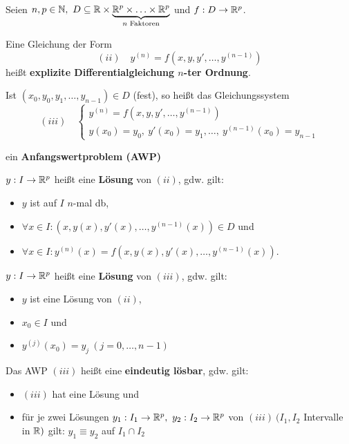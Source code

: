 \documentclass[a4paper,twoside,DIV15,BCOR12mm]{scrbook}
\begin{document}
\begin{definition}
Seien $n,p \in\MdN,\ D\subseteq\MdR\times\underbrace{\MdR^p\times\ldots\times\MdR^p}_{n\text{ Faktoren}}$ und $f:D\to\mathbb{R}^p$.

Eine Gleichung der Form $$(ii)\quad y^{(n)} = f(x,y,y',\ldots,y^{(n-1)})$$ heißt \textbf{explizite Differentialgleichung $n$-ter Ordnung}.


Ist $(x_0,y_0,y_1,\ldots,y_{n-1})\in D$ (fest), so heißt das Gleichungssystem
$$(iii)\quad\begin{cases}y^{(n)} = f(x,y,y',\ldots,y^{(n-1)})\\ y(x_0)=y_0,\ y'(x_0)=y_1,\ldots,\ y^{(n-1)}(x_0)=y_{n-1}\end{cases}$$

ein \textbf{Anfangswertproblem (AWP)}


$y:I\to\mathbb{R}^p$ heißt eine \textbf{Lösung} von $(ii)$, gdw. gilt:
\begin{itemize}
\item $y$ ist auf $I$ $n$-mal db,
\item $\forall x\in I: (x,y(x),y'(x),\ldots,y^{(n-1)}(x))\in D$ und
\item $\forall x\in I: y^{(n)}(x) = f(x,y(x),y'(x),\ldots,y^{(n-1)}(x)).$
\end{itemize}


$y:I\to\mathbb{R}^p$ heißt eine \textbf{Lösung} von $(iii)$, gdw. gilt:
\begin{itemize}
\item $y$ ist eine Lösung von $(ii)$,
\item $x_0 \in I$ und
\item $y^{(j)}(x_0) = y_j\ (j=0,\ldots,n-1)$
\end{itemize}

Das AWP $(iii)$ heißt eine \textbf{eindeutig lösbar}, gdw. gilt:
\begin{itemize}
\item $(iii)$ hat eine Lösung und
\item für je zwei Lösungen $y_1:I_1\to\mathbb{R}^p,\ y_2:I_2\to\mathbb{R}^p$ von $(iii)\ (I_1,I_2$ Intervalle in $\mathbb{R})$ gilt: $y_1\equiv y_2$ auf $I_1 \cap I_2$
\end{itemize}
\end{definition}
\end{document}
